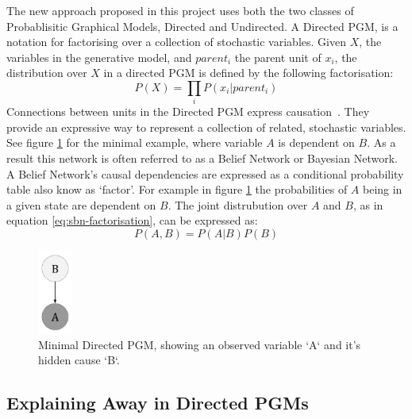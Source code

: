 The new approach proposed in this project uses both the two classes of Probablisitic Graphical Models, Directed and Undirected. A Directed PGM, is a notation for factorising over a collection of stochastic variables.
Given $X$, the variables in the generative model, and $parent_i$ the parent unit of $x_i$, the distribution over $X$ in a directed PGM is defined by the following factorisation:
\begin{equation}\label{eq:sbn-factorisation}
P(X) = \prod_i P(x_i | parent_i)
\end{equation}
Connections between units in the Directed PGM express causation~\cite{Pearl:1988:PRI:52121}. They provide an expressive way to represent a collection of related, stochastic variables. See figure \ref{F:PGM-example} for the minimal example, where variable $A$ is dependent on $B$. As a result this network is often referred to as a Belief Network or Bayesian Network. A Belief Network's causal dependencies are expressed as a conditional probability table also know as `factor'. For example in figure \ref{F:PGM-example} the probabilities of $A$ being in a given state are dependent on $B$. The joint distrubution over $A$ and $B$, as in equation \ref{eq:sbn-factorisation}, can be expressed as:
$$P(A,B) = P(A|B)P(B)$$
\begin{figure}
\begin{center}
  \includegraphics[width = 0.1\textwidth]{Assets/PGM_Example_1.png}
\caption{Minimal Directed PGM, showing an observed variable `A` and it's hidden cause `B`.}
\label{F:PGM-example}
\end{center}
\end{figure}

\subsection{Explaining Away in Directed PGMs}\label{S:Explaining-Away}

